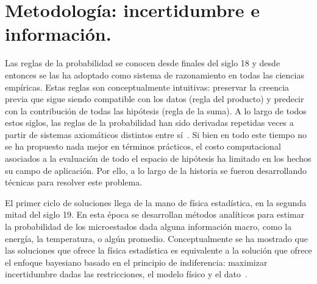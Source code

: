 \documentclass[a4paper,11pt]{book}
\theoremstyle{definition}
\begin{document}
\chapter{Metodología: incertidumbre e información.}




Las reglas de la probabilidad se conocen desde finales del siglo 18 y desde entonces se las ha adoptado como sistema de razonamiento en todas las ciencias empíricas.
%
Estas reglas son conceptualmente intuitivas: preservar la creencia previa que sigue siendo compatible con los datos (regla del producto) y predecir con la contribución de todas las hipótesis (regla de la suma).
%
A lo largo de todos estos siglos, las reglas de la probabilidad han sido derivadas repetidas veces a partir de sistemas axiom\'aticos distintos entre sí~\cite{halpern2017}.
%
Si bien en todo este tiempo no se ha propuesto nada mejor en términos prácticos, el costo computacional asociados a la evaluación de todo el espacio de hipótesis ha limitado en los hechos su campo de aplicación.
%
Por ello, a lo largo de la historia se fueron desarrollando técnicas para resolver este problema.


El primer ciclo de soluciones llega de la mano de física estadística, en la segunda mitad del siglo 19.
%
En esta época se desarrollan métodos analíticos para estimar la probabilidad de los microestados dada alguna información macro, como la energía, la temperatura, o algún promedio.
%
Conceptualmente se ha mostrado que las soluciones que ofrece la física estadística es equivalente a la solución que ofrece el enfoque bayesiano basado en el principio de indiferencia: maximizar incertidumbre dadas las restricciones, el modelo físico y el dato~\cite{jaynes1957-informationTheoryAndStatisticalMechanics, jaynes2003-bookProbabilityTheory}.
\end{document}
